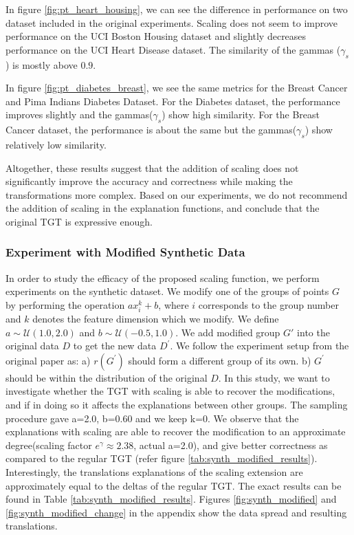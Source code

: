 In figure \ref{fig:pt_heart_housing}, we can see the difference in performance on two dataset included in the original experiments. Scaling does not seem to improve performance on the UCI Boston Housing dataset and slightly decreases performance on the UCI Heart Disease dataset. The similarity of the gammas ($\gamma_s$) is mostly above $0.9$. 

In figure \ref{fig:pt_diabetes_breast},  we see the same metrics for the Breast Cancer and Pima Indians Diabetes Dataset. For the Diabetes dataset, the performance improves slightly and the gammas($\gamma_s$) show high similarity. For the Breast Cancer dataset, the performance is about the same but the gammas($\gamma_s$) show relatively low similarity. 

Altogether, these results suggest that the addition of scaling does not significantly improve the accuracy and correctness while making the transformations more complex. Based on our experiments, we do not recommend the addition of scaling in the explanation functions, and conclude that the original TGT is expressive enough. 

\subsubsection{Experiment with Modified Synthetic Data}
In order to study the efficacy of the proposed scaling function, we perform experiments on the synthetic dataset. We modify one of the groups of points $G$ by performing the operation $ax_{i}^{k} + b$, where $i$ corresponds to the group number and $k$ denotes the feature dimension which we modify. We define $a \sim \mathcal{U}(1.0, 2.0)$  and $b \sim \mathcal{U}(-0.5, 1.0)$. We add modified group $G'$ into the original data $D$ to get the new data $D^{'}$. We follow the experiment setup from the original paper as: a) $r(G^{'})$ should form a different group of its own. b) $G^{'}$ should be within the distribution of the original $D$. In this study, we want to investigate whether the TGT with scaling is able to recover the modifications, and if in doing so it affects the explanations between other groups. The sampling procedure gave a=2.0, b=0.60 and we keep k=0. We observe that the explanations with scaling are able to recover the modification to an approximate degree(scaling factor $e^{\gamma} \approx 2.38$, actual a=2.0), and give better correctness as compared to the regular TGT (refer figure \ref{tab:synth_modified_results}). Interestingly, the translations explanations of the scaling extension are approximately equal to the deltas of the regular TGT. The exact results can be found in Table \ref{tab:synth_modified_results}. Figures \res \ref{fig:synth_modified} and \ref{fig:synth_modified_change} in the appendix show the data spread and resulting translations. 

